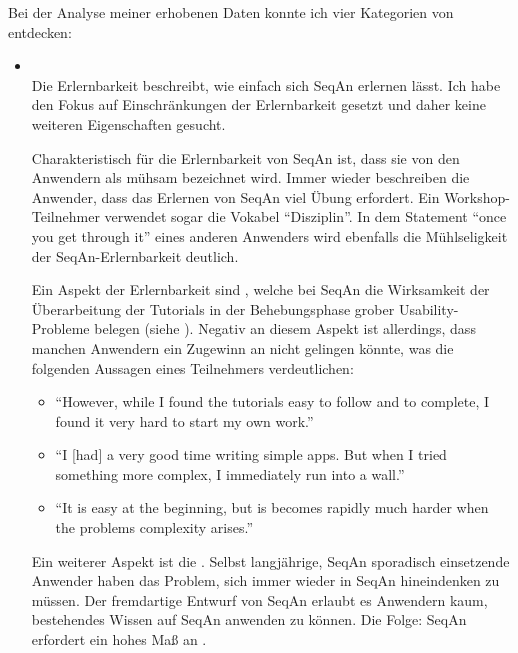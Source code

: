 Bei der Analyse meiner erhobenen Daten konnte ich vier Kategorien von  entdecken:
\begin{itemize}
  \item[\codebullet{apiua://code/-9223372036854774824}] \textbf{} \\
  Die Erlernbarkeit beschreibt, wie einfach sich SeqAn erlernen lässt. Ich habe den Fokus auf Einschränkungen der Erlernbarkeit gesetzt und daher keine weiteren Eigenschaften gesucht.
  
  Charakteristisch für die Erlernbarkeit von SeqAn ist, dass sie von den Anwendern als mühsam bezeichnet wird. Immer wieder beschreiben die Anwender, dass das Erlernen von SeqAn viel Übung erfordert. Ein Workshop-Teilnehmer verwendet sogar die Vokabel ``Disziplin''. In dem Statement ``once you get through it'' eines anderen Anwenders wird ebenfalls die Mühlseligkeit der SeqAn-Erlernbarkeit deutlich.
  
  Ein Aspekt der Erlernbarkeit sind , welche bei SeqAn die Wirksamkeit der Überarbeitung der Tutorials in der Behebungsphase grober Usability-Probleme belegen (siehe ). Negativ an diesem Aspekt ist allerdings, dass manchen Anwendern ein Zugewinn an  nicht gelingen könnte, was die folgenden Aussagen eines Teilnehmers verdeutlichen:
  \begin{itemize}
    \item ``However, while I found the tutorials easy to follow and to complete, I found it very hard to start my own work.''
    \item ``I [had] a very good time writing simple apps. But when I tried something more complex, I immediately run into a wall.''
    \item ``It is easy at the beginning, but is becomes rapidly much harder when the problems complexity arises.''
  \end{itemize}
  
  Ein weiterer Aspekt ist die . Selbst langjährige, SeqAn sporadisch einsetzende Anwender haben das Problem, sich immer wieder in SeqAn hineindenken zu müssen. Der fremdartige Entwurf von SeqAn erlaubt es Anwendern kaum, bestehendes Wissen auf SeqAn anwenden zu können. Die Folge: SeqAn erfordert ein hohes Maß an .%
  

\end{itemize}
